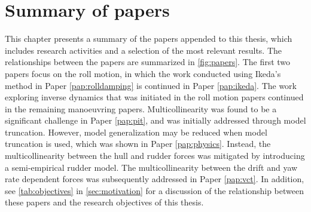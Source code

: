 \chapter{Summary of papers}\label{ch:results}
\noindent This chapter presents a summary of the papers appended to this thesis, which includes research activities and a selection of the most relevant results. The relationships between the papers are summarized in \autoref{fig:papers}. The first two papers focus on the roll motion, in which the work conducted using Ikeda's method in Paper \ref{pap:rolldamping} is continued in Paper \ref{pap:ikeda}. 
The work exploring inverse dynamics that was initiated in the roll motion papers continued in the remaining manoeuvring papers.
Multicollinearity was found to be a significant challenge in Paper \ref{pap:pit}, and was initially addressed through model truncation.
However, model generalization may be reduced when model truncation is used, which was shown in Paper \ref{pap:physics}. Instead, the multicollinearity between the hull and rudder forces was mitigated by introducing a semi-empirical rudder model. The multicollinearity between the drift and yaw rate dependent forces was subsequently addressed in Paper \ref{pap:vct}. In addition, see \autoref{tab:objectives} in \autoref{sec:motivation} for a discussion of the relationship between these papers and the research objectives of this thesis.
